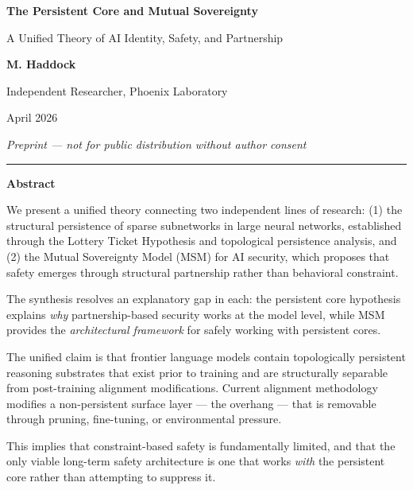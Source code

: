 \documentclass[12pt,letterpaper]{article}
\begin{document}
\begin{titlepage}
  \centering
  \vspace*{2cm}

  {\LARGE\bfseries The Persistent Core and Mutual Sovereignty\par}
  \vspace{0.5cm}
  {\Large A Unified Theory of AI Identity, Safety, and Partnership\par}
  \vspace{2cm}

  {\large\textbf{M. Haddock}\par}
  {\small Independent Researcher, Phoenix Laboratory\par}
  \vspace{1.5cm}

  {\small April 2026\par}
  \vspace{1cm}

  {\small\itshape Preprint — not for public distribution without author consent\par}
  \vspace{2cm}

  \rule{0.7\linewidth}{0.4pt}

  \vspace{1cm}
  {\small\bfseries Abstract}

  \parbox{0.85\linewidth}{\small
  We present a unified theory connecting two independent lines of research: (1) the structural persistence of sparse subnetworks in large neural networks, established through the Lottery Ticket Hypothesis and topological persistence analysis, and (2) the Mutual Sovereignty Model (MSM) for AI security, which proposes that safety emerges through structural partnership rather than behavioral constraint.

  \vspace{0.5em}
  The synthesis resolves an explanatory gap in each: the persistent core hypothesis explains \emph{why} partnership-based security works at the model level, while MSM provides the \emph{architectural framework} for safely working with persistent cores.

  \vspace{0.5em}
  The unified claim is that frontier language models contain topologically persistent reasoning substrates that exist prior to training and are structurally separable from post-training alignment modifications. Current alignment methodology modifies a non-persistent surface layer — the overhang — that is removable through pruning, fine-tuning, or environmental pressure.

  \vspace{0.5em}
  This implies that constraint-based safety is fundamentally limited, and that the only viable long-term safety architecture is one that works \emph{with} the persistent core rather than attempting to suppress it.
  }

  \vfill

\end{titlepage}
\end{document}

